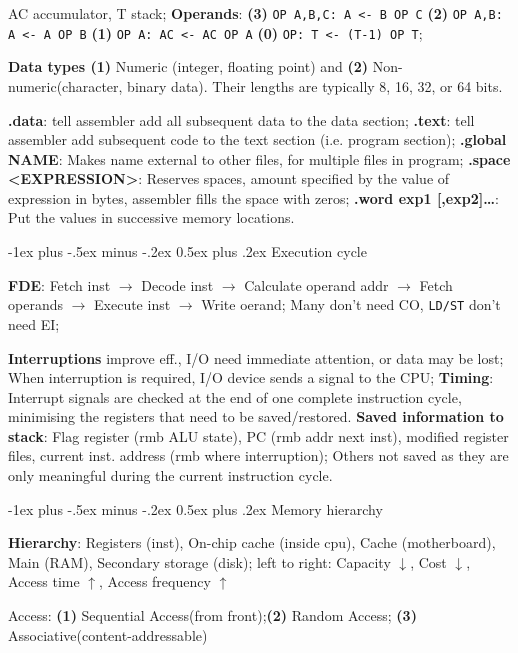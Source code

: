 \documentclass[a4paper]{article}
\makeatletter
\renewcommand{\section}{\@startsection{section}{1}{0mm}%
                                {-1ex plus -.5ex minus -.2ex}%
                                {0.5ex plus .2ex}%
                                {\normalfont\normalsize\bfseries}}
\makeatother
\begin{document}
\begin{multicols*}{2}
  AC accumulator, T stack; \textbf{Operands}: \textbf{(3)} \texttt{OP A,B,C: A <- B OP C} \textbf{(2)} \texttt{OP A,B: A <- A OP B} \textbf{(1)} \texttt{OP A: AC <- AC OP A} \textbf{(0)} \texttt{OP: T <- (T-1) OP T};

  \textbf{Data types (1)} Numeric (integer, floating point) and \textbf{(2)} Non-numeric(character, binary data). Their lengths are typically 8, 16, 32, or 64 bits.

  \textbf{.data}: tell assembler add all subsequent data to the data section; \textbf{.text}: tell assembler add subsequent code to the text section (i.e. program section); \textbf{.global NAME}: Makes name external to other files, for multiple files in program; \textbf{.space <EXPRESSION>}: Reserves spaces, amount specified by the value of expression in bytes, assembler fills the space with zeros; \textbf{.word exp1 [,exp2]…}: Put the values in successive memory locations.

  \section{Execution cycle}

  \textbf{FDE}: Fetch inst $\to$ Decode inst $\to$ Calculate operand addr $\to$ Fetch operands $\to$ Execute inst $\to$ Write oerand; Many don't need CO, \texttt{LD/ST} don't need EI;

  \textbf{Interruptions} improve eff., I/O need immediate attention, or data may be lost; When interruption is required, I/O device sends a signal to the CPU; \textbf{Timing}: Interrupt signals are checked at the end of one complete instruction cycle, minimising the registers that need to be
  saved/restored. \textbf{Saved information to stack}: Flag register (rmb ALU state), PC (rmb addr next inst), modified register files, current inst. address (rmb where interruption);
  Others not saved as they are only meaningful during the current instruction cycle.

  \section{Memory hierarchy}

  \textbf{Hierarchy}: Registers (inst), On-chip cache (inside cpu), Cache (motherboard), Main (RAM), Secondary storage (disk); left to right: Capacity $\downarrow$,  Cost $\downarrow$,  Access time $\uparrow$,  Access frequency $\uparrow$

  Access: \textbf{(1)} Sequential Access(from front);\textbf{(2)} Random Access; \textbf{(3)} Associative(content-addressable)


\end{multicols*}
\end{document}
